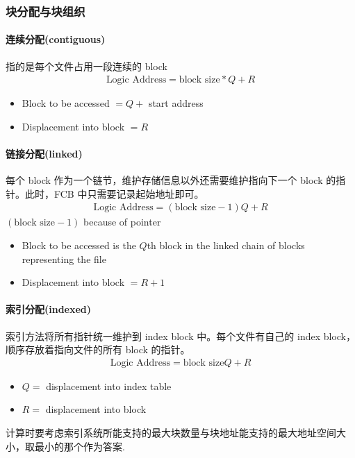 \subsubsection{块分配与块组织}

\paragraph{连续分配(contiguous)}指的是每个文件占用一段连续的 block
\begin{align*}
    \text{Logic Address}=\text{block size}*Q+R
\end{align*}
\begin{itemize}
    \item Block to be accessed $=Q+$ start address
    \item Displacement into block $=R$
\end{itemize}

\paragraph{链接分配(linked)}每个 block 作为一个链节，维护存储信息以外还需要维护指向下一个 block 的指针。此时，FCB 中只需要记录起始地址即可。
\begin{align*}
    \text{Logic Address}=(\text{block size}-1)Q+R
\end{align*}
$(\text{block size}-1)$ because of pointer
\begin{itemize}
    \item Block to be accessed is the $Q$th block in the linked chain of
    blocks representing the file
    \item Displacement into block $=R+1$
\end{itemize}


\paragraph{索引分配(indexed)}索引方法将所有指针统一维护到 index block 中。每个文件有自己的 index block，顺序存放着指向文件的所有 block 的指针。
\begin{align*}
    \text{Logic Address}=\text{block size}Q+R
\end{align*}
\begin{itemize}
    \item $Q =$ displacement into index table
    \item $R =$ displacement into block
\end{itemize}
计算时要考虑索引系统所能支持的最大块数量与块地址能支持的最大地址空间大小，取最小的那个作为答案. 

